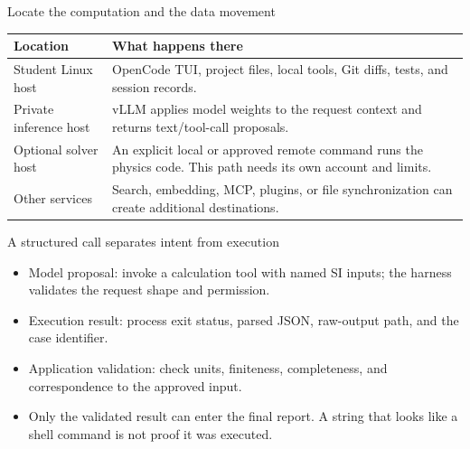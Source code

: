 \documentclass[aspectratio=169,11pt]{beamer}
\begin{document}
\begin{frame}[t,fragile]{Locate the computation and the data movement}
\fontsize{10.5}{12.5}\selectfont\setlength{\tabcolsep}{4pt}\renewcommand{\arraystretch}{1.15}
\begin{tabular}{>{\raggedright\arraybackslash}p{}>{\raggedright\arraybackslash}p{}}
\toprule
\textbf{Location} & \textbf{What happens there} \\ \midrule
Student Linux host & OpenCode TUI, project files, local tools, Git diffs, tests, and session records. \\[2pt]
Private inference host & vLLM applies model weights to the request context and returns text/tool-call proposals. \\[2pt]
Optional solver host & An explicit local or approved remote command runs the physics code. This path needs its own account and limits. \\[2pt]
Other services & Search, embedding, MCP, plugins, or file synchronization can create additional destinations. \\[2pt]
\bottomrule\end{tabular}\par\vspace{2mm}
\end{frame}
\begin{frame}[t,fragile]{A structured call separates intent from execution}
\fontsize{11.5}{14}\selectfont
\begin{itemize}\setlength{\itemsep}{2mm}
\item Model proposal: invoke a calculation tool with named SI inputs; the harness validates the request shape and permission.
\item Execution result: process exit status, parsed JSON, raw-output path, and the case identifier.
\item Application validation: check units, finiteness, completeness, and correspondence to the approved input.
\item Only the validated result can enter the final report. A string that looks like a shell command is not proof it was executed.
\end{itemize}
\end{frame}
\end{document}
